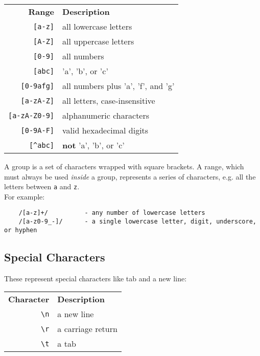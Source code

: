 \begin{center}
    \begin{small}
        \begin{tabularx}{\textwidth}{r l}
            \textbf{Range}          & \textbf{Description} \\
            \texttt{[a-z]}          & all lowercase letters \\
            \texttt{[A-Z]}          & all uppercase letters \\
            \texttt{[0-9]}          & all numbers \\
            \texttt{[abc]}          & 'a', 'b', or 'c' \\
            \texttt{[0-9afg]}       & all numbers plus 'a', 'f', and 'g' \\
            \texttt{[a-zA-Z]}       & all letters, case-insensitive \\
            \texttt{[a-zA-Z0-9]}    & alphanumeric characters \\
            \texttt{[0-9A-F]}       & valid hexadecimal digits \\
            \texttt{[\textasciicircum abc]}         & \textbf{not} 'a', 'b', or 'c'
        \end{tabularx}
    \end{small}
\end{center}

A group is a set of characters wrapped with square brackets. A range, which must always be used \textit{inside} a group, represents a series of characters, e.g. all the letters between \texttt{a} and \texttt{z}.
\\

For example:

\begin{verbatim}
    /[a-z]+/          - any number of lowercase letters
    /[a-z0-9_-]/      - a single lowercase letter, digit, underscore, or hyphen
\end{verbatim}

\subsection{Special Characters}

These represent special characters like tab and a new line:

\begin{center}
    \begin{small}
        \begin{tabularx}{\textwidth}{r l}
            \textbf{Character}          & \textbf{Description} \\
            \texttt{\textbackslash n}          & a new line \\
            \texttt{\textbackslash r}          & a carriage return \\
            \texttt{\textbackslash t}          & a tab \\
        \end{tabularx}
    \end{small}
\end{center}

